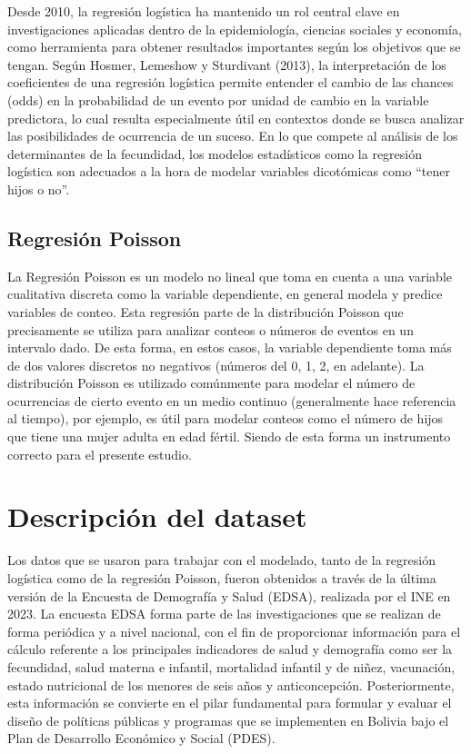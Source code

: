 \documentclass[Royal,times,sageh]{sagej}
\begin{document}
Desde 2010, la regresión logística ha mantenido un rol central clave en
investigaciones aplicadas dentro de la epidemiología, ciencias sociales
y economía, como herramienta para obtener resultados importantes según
los objetivos que se tengan. Según Hosmer, Lemeshow y Sturdivant (2013),
la interpretación de los coeficientes de una regresión logística permite
entender el cambio de las chances (odds) en la probabilidad de un evento
por unidad de cambio en la variable predictora, lo cual resulta
especialmente útil en contextos donde se busca analizar las
posibilidades de ocurrencia de un suceso. En lo que compete al análisis
de los determinantes de la fecundidad, los modelos estadísticos como la
regresión logística son adecuados a la hora de modelar variables
dicotómicas como ``tener hijos o no''.

\subsection{Regresión Poisson}\label{regresiuxf3n-poisson}

La Regresión Poisson es un modelo no lineal que toma en cuenta a una
variable cualitativa discreta como la variable dependiente, en general
modela y predice variables de conteo. Esta regresión parte de la
distribución Poisson que precisamente se utiliza para analizar conteos o
números de eventos en un intervalo dado. De esta forma, en estos casos,
la variable dependiente toma más de dos valores discretos no negativos
(números del 0, 1, 2, en adelante). La distribución Poisson es utilizado
comúnmente para modelar el número de ocurrencias de cierto evento en un
medio continuo (generalmente hace referencia al tiempo), por ejemplo, es
útil para modelar conteos como el número de hijos que tiene una mujer
adulta en edad fértil. Siendo de esta forma un instrumento correcto para
el presente estudio.

\section{Descripción del dataset}\label{descripciuxf3n-del-dataset}

Los datos que se usaron para trabajar con el modelado, tanto de la
regresión logística como de la regresión Poisson, fueron obtenidos a
través de la última versión de la Encuesta de Demografía y Salud (EDSA),
realizada por el INE en 2023. La encuesta EDSA forma parte de las
investigaciones que se realizan de forma periódica y a nivel nacional,
con el fin de proporcionar información para el cálculo referente a los
principales indicadores de salud y demografía como ser la fecundidad,
salud materna e infantil, mortalidad infantil y de niñez, vacunación,
estado nutricional de los menores de seis años y anticoncepción.
Posteriormente, esta información se convierte en el pilar fundamental
para formular y evaluar el diseño de políticas públicas y programas que
se implementen en Bolivia bajo el Plan de Desarrollo Económico y Social
(PDES).
\end{document}
